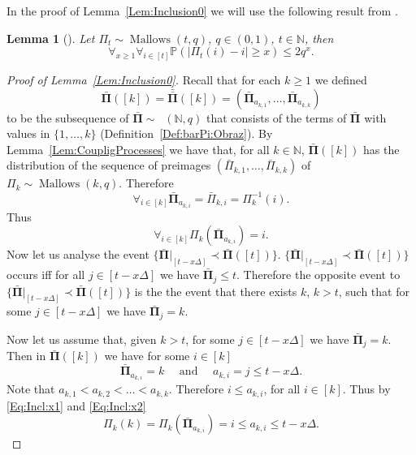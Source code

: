 \documentclass[letterpaper,11pt]{article}
\newtheorem{lemma}[theorem]{Lemma}
\theoremstyle{definition}
\theoremstyle{remark}
\renewcommand{\le}{\leqslant}
\renewcommand{\ge}{\geqslant}
\DeclareMathOperator{\Mallow}{Mallows}
\DeclareMathOperator{\Mallows}{Mallows_{seq}}
\newcommand{\bN}{\mathbb{N}}
\newcommand{\Pra}[1]{\mathbb{P}\left(#1\right)}
\newcommand{\barpi}{\bar \varPi}
\newcommand{\barPi}{\bar {\mathbf \Pi}}
\newcommand{\barbarPi}{{\bar{\bar {\mathbf \Pi}}}}
\newcommand{\NN}{\mathbb{N}}
\newcommand{\subseq}{\prec}
\begin{document}
In the proof of Lemma~\ref{Lem:Inclusion0} we will use the following result from \cite{BhatnagarPeled2015}.

\begin{lemma}[{\cite[Theorem 1.1]{BhatnagarPeled2015}}]\label{Lem:CouplingKnown}
	Let $\varPi_t\sim\Mallow(t,q)$, $q\in (0,1)$, $t\in \NN$, then
	\[
	\forall_{x\ge 1}\forall_{i\in [t]}\Pra{|\varPi_t(i)-i|\ge x}\le 2q^{x}. 
	\]
\end{lemma}



\begin{proof}[Proof of Lemma~\ref{Lem:Inclusion0}]
	Recall that for each $k\ge 1$ we defined
	\[\barPi([k])=\barbarPi([k])=(\barPi_{a_{k,1}},\ldots,\barPi_{a_{k,k}})
	\]
	to be the subsequence of $\barPi\sim \Mallows(\bN,q)$ that consists of the terms of $\barPi$ with values in $\{1,\ldots,k\}$ (Definition~\ref{Def:barPi:Obraz}).
	By Lemma~\ref{Lem:CoupligProcesses} we have that, for all $k\in \NN$, $\barPi([k])$ has the distribution of the sequence of preimages $(\barpi_{k,1},\ldots,\barpi_{k,k})$ of  $\varPi_{k}\sim\Mallow(k,q)$. Therefore
	\[\forall_{i\in [k]} \barPi_{a_{k,i}}=\barpi_{k,i}=\varPi_k^{-1}(i).\]
	Thus
	\begin{equation}\label{Eq:Incl:x1}
		\forall_{i\in [k]} \varPi_k(\barPi_{a_{k,i}})=i.	
	\end{equation}
	Now let us analyse the event  $\{\barPi|_{[t-x\Delta]}\subseq \barPi([t])\}.$
	$\{\barPi|_{[t-x\Delta]}\subseq \barPi([t])\}$ occurs iff for all $j\in [t-x\Delta]$ we have $\barPi_j\le t$. Therefore the opposite event to $\{\barPi|_{[t-x\Delta]}\subseq \barPi([t])\}$  is the the event that there exists $k$, $k>t$, such that for some $j\in [t-x\Delta]$ we have $\barPi_j=k$. 
	
	
	Now let us assume that, given $k>t$, for some $j\in [t-x\Delta]$ we have $\barPi_j=k$. Then in $\barPi([k])$ we have for some $i\in [k]$ 
	\begin{equation}\label{Eq:Incl:x2}
		\barPi_{a_{k,i}}=k\quad\text{ and }\quad a_{k,i}=j\le t-x\Delta.
	\end{equation}
	Note that $a_{k,1}<a_{k,2}<\ldots<a_{k,k}$. Therefore $i\le a_{k,i}$, for all $i\in [k]$. Thus by \eqref{Eq:Incl:x1} and \eqref{Eq:Incl:x2}
	\begin{equation}\label{Eq:Incl:x3}
		\varPi_k(k)=\varPi_k(\barPi_{a_{k,i}})=i\le a_{k,i} \le t- x\Delta.
	\end{equation}
	

\end{proof}
\end{document}
